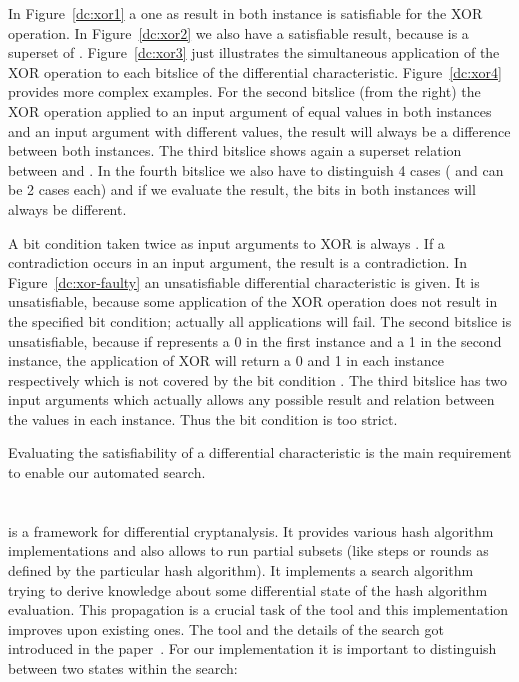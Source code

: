 In Figure~\ref{dc:xor1} a one as result in both instance is satisfiable for the XOR operation. In Figure~\ref{dc:xor2} we also have a satisfiable result, because  is a superset of . Figure~\ref{dc:xor3} just illustrates the simultaneous application of the XOR operation to each bitslice of the differential characteristic. Figure~\ref{dc:xor4} provides more complex examples. For the second bitslice (from the right) the XOR operation applied to an input argument of equal values in both instances and an input argument with different values, the result will always be a difference between both instances. The third bitslice shows again a superset relation between  and . In the fourth bitslice we also have to distinguish 4 cases ( and  can be 2 cases each) and if we evaluate the result, the bits in both instances will always be different.

A bit condition taken twice as input arguments to XOR is always . If a contradiction occurs in an input argument, the result is a contradiction. In Figure~\ref{dc:xor-faulty} an unsatisfiable differential characteristic is given. It is unsatisfiable, because some application of the XOR operation does not result in the specified bit condition; actually all applications will fail. The second bitslice is unsatisfiable, because if  represents a 0 in the first instance and a 1 in the second instance, the application of XOR will return a 0 and 1 in each instance respectively which is not covered by the bit condition . The third bitslice has two input arguments which actually allows any possible result and relation between the values in each instance. Thus the bit condition \bc{-} is too strict.

Evaluating the satisfiability of a differential characteristic is the main requirement to enable our automated search.

\section{\nltool}
\label{sec:nltool}
%
\nltool{} is a framework for differential cryptanalysis. It provides various hash algorithm implementations and also allows to run partial subsets (like steps or rounds as defined by the particular hash algorithm). It implements a search algorithm trying to derive knowledge about some differential state of the hash algorithm evaluation. This propagation is a crucial task of the tool and this implementation improves upon existing ones. The tool and the details of the search got introduced in the paper~\cite[293]{Cry07}. For our implementation it is important to distinguish between two states within the search:


